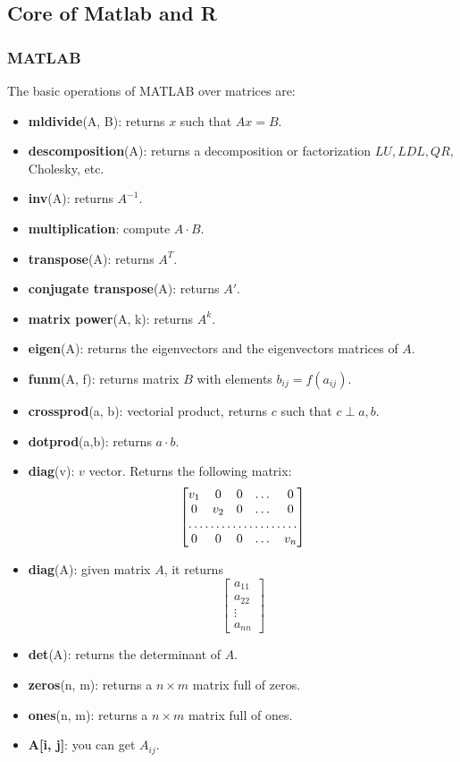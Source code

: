 \subsection{Core of Matlab and R}

\subsubsection*{MATLAB}

The basic operations of MATLAB over matrices are:

\begin{itemize}
	\item \textbf{mldivide}(A, B): returns $x$ such that $Ax=B$.
	\item \textbf{descomposition}(A): returns a decomposition or factorization $LU, LDL, QR,$ Cholesky, etc.
	\item \textbf{inv}(A): returns $A^{-1}$.
	\item \textbf{multiplication}: compute $A\cdot B$.
	\item \textbf{transpose}(A): returns $A^T$.
	\item \textbf{conjugate transpose}(A): returns $A'$.
	\item \textbf{matrix power}(A, k): returns $A^k$.
	\item \textbf{eigen}(A): returns the eigenvectors and the eigenvectors matrices of $A$.
	\item \textbf{funm}(A, f): returns matrix $B$ with elements $b_{ij}=f(a_{ij})$.
	\item \textbf{crossprod}(a, b): vectorial product, returns $c$ such that $c\perp a, b.$
	\item \textbf{dotprod}(a,b): returns $a\cdot b$.
	\item \textbf{diag}(v): $v$ vector. Returns the following matrix: 
	\[
\begin{bmatrix}
    v_{1}       & 0 & 0 & \dots & 0 \\
    0       & v_{2} & 0 & \dots & 0 \\
    \hdotsfor{5} \\
    0       & 0 & 0 & \dots & v_{n}
\end{bmatrix}
\]
	\item \textbf{diag}(A): given matrix $A$, it returns
	\[
\begin{bmatrix}
    a_{11} \\
    a_{22} \\
    \vdots \\
    a_{nn}
\end{bmatrix}
\]
	\item \textbf{det}(A): returns the determinant of $A$.
	\item \textbf{zeros}(n, m): returns a $n\times m$ matrix full of zeros.
	\item \textbf{ones}(n, m): returns a $n\times m$ matrix full of ones.
	\item \textbf{A[i, j]}: you can get $A_{ij}$.
\end{itemize}


